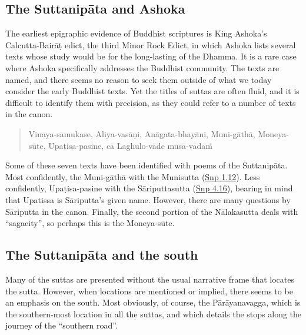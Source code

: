 \documentclass[12pt,openany]{book}%
\begin{document}
\subsection*{The \textsanskrit{Suttanipāta} and Ashoka}

The earliest epigraphic evidence of Buddhist scriptures is King Ashoka’s Calcutta-\textsanskrit{Bairāṭ} edict, the third Minor Rock Edict, in which Ashoka lists several texts whose study would be for the long-lasting of the Dhamma. It is a rare case where Ashoka specifically addresses the Buddhist community. The texts are named, and there seems no reason to seek them outside of what we today consider the early Buddhist texts. Yet the titles of suttas are often fluid, and it is difficult to identify them with precision, as they could refer to a number of texts in the canon.

\begin{quotation}%
Vinaya-samukase, Aliya-\textsanskrit{vasāṇi}, \textsanskrit{Anāgata}-\textsanskrit{bhayāni}, Muni-\textsanskrit{gāthā}, Moneya-\textsanskrit{sūte}, \textsanskrit{Upaṭisa}-pasine, \textsanskrit{cā} Laghulo-\textsanskrit{vāde} \textsanskrit{musā}-\textsanskrit{vādaṁ}

%
\end{quotation}

Some of these seven texts have been identified with poems of the \textsanskrit{Suttanipāta}. Most confidently, the Muni-\textsanskrit{gāthā} with the Munisutta (\href{https://suttacentral.net/snp1.12/en/sujato}{Snp 1.12}). Less confidently, \textsanskrit{Upaṭisa}-pasine with the \textsanskrit{Sāriputtasutta} (\href{https://suttacentral.net/snp4.16/en/sujato}{Snp 4.16}), bearing in mind that Upatissa is \textsanskrit{Sāriputta}’s given name. However, there are many questions by \textsanskrit{Sāriputta} in the canon. Finally, the second portion of the \textsanskrit{Nālakasutta} deals with “sagacity”, so perhaps this is the Moneya-\textsanskrit{sūte}.

\subsection*{The \textsanskrit{Suttanipāta} and the south}

Many of the suttas are presented without the usual narrative frame that locates the sutta. However, when locations are mentioned or implied, there seems to be an emphasis on the south. Most obviously, of course, the \textsanskrit{Pārāyanavagga}, which is the southern-most location in all the suttas, and which details the stops along the journey of the “southern road”.
\end{document}
